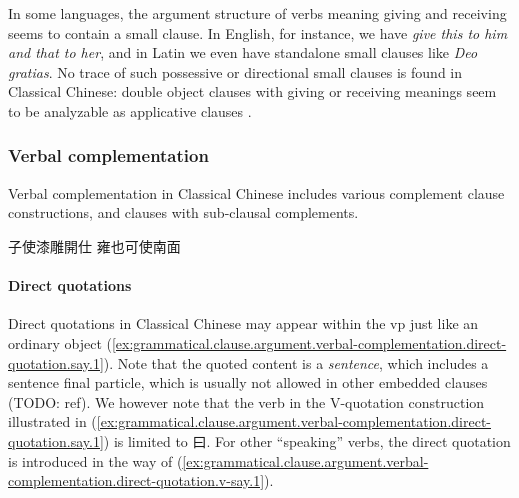 \documentclass[UTF8, a4paper, oneside, scheme=plain, 12pt]{ctexrep}
\newcommand*{\citepages}[1]{pp.~{#1}}
\newcommand{\form}[1]{\emph{#1}}
\begin{document}
In some languages, the argument structure of verbs meaning giving and receiving
seems to contain a small clause.
In English, for instance, we have \form{give this to him and that to her},
and in Latin we even have standalone small clauses like \form{Deo gratias}.
No trace of such possessive or directional small clauses is found in Classical Chinese:
double object clauses with giving or receiving meanings seem to be analyzable as applicative clauses
\citep[\citepages{416-421}]{meiguang2018}.

\subsubsection{Verbal complementation}

Verbal complementation in Classical Chinese includes various complement clause constructions,
and clauses with sub-clausal complements.


\begin{exe}
    \ex 子使漆雕開仕
    \ex 雍也可使南面
\end{exe}

\paragraph{Direct quotations}\label{sec:grammatical.clause.argument.verbal-complementation.direct-quotation}

Direct quotations in Classical Chinese may appear within the \ac{vp} just like an ordinary object (\ref{ex:grammatical.clause.argument.verbal-complementation.direct-quotation.say.1}).
Note that the quoted content is a \emph{sentence}, which includes a sentence final particle,
which is usually not allowed in other embedded clauses (TODO: ref).
We however note that the verb in the V-quotation construction illustrated in (\ref{ex:grammatical.clause.argument.verbal-complementation.direct-quotation.say.1}) is limited to 曰.
For other ``speaking'' verbs, the direct quotation is introduced in the way of (\ref{ex:grammatical.clause.argument.verbal-complementation.direct-quotation.v-say.1}).
\end{document}

